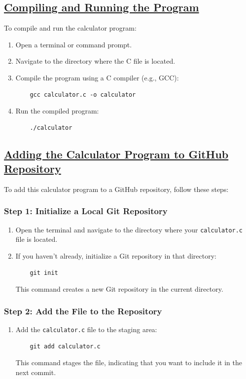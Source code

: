 \documentclass{article}
\begin{document}
\subsection{\underline{Compiling and Running the Program}}
To compile and run the calculator program:
\begin{enumerate}
    \item Open a terminal or command prompt.
    \item Navigate to the directory where the C file is located.
    \item Compile the program using a C compiler (e.g., GCC):
    \begin{verbatim}
    gcc calculator.c -o calculator
    \end{verbatim}
    \item Run the compiled program:
    \begin{verbatim}
    ./calculator
    \end{verbatim}
\end{enumerate}

\subsection{\underline{Adding the Calculator Program to GitHub Repository}}
To add this calculator program to a GitHub repository, follow these steps:

\subsubsection{Step 1: Initialize a Local Git Repository}
\begin{enumerate}
    \item Open the terminal and navigate to the directory where your \texttt{calculator.c} file is located.
    \item If you haven't already, initialize a Git repository in that directory:
    \begin{verbatim}
    git init
    \end{verbatim}
    This command creates a new Git repository in the current directory.
\end{enumerate}
\newpage
{}

\subsubsection{Step 2: Add the File to the Repository}
\begin{enumerate}
    \item Add the \texttt{calculator.c} file to the staging area:
    \begin{verbatim}
    git add calculator.c
    \end{verbatim}
    This command stages the file, indicating that you want to include it in the next commit.
\end{enumerate}
\end{document}
